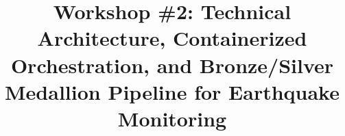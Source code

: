 \documentclass[conference]{IEEEtran}
\begin{document}
\title{Workshop \#2: Technical Architecture, Containerized Orchestration, and Bronze/Silver Medallion Pipeline for Earthquake Monitoring}

\author{
\and
{}
\and
{}
}

\maketitle










\end{document}
